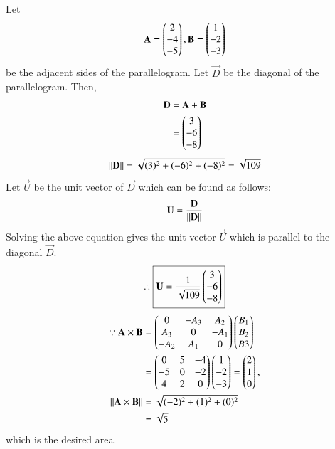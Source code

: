 
 Let 
    \begin{align}
        \mathbf{A}=\begin{pmatrix}2\\-4\\-5\end{pmatrix}, \mathbf{B}=\begin{pmatrix}1\\-2\\-3\end{pmatrix}
    \end{align}
    be the adjacent sides of the parallelogram. Let $\vec{D}$ be the diagonal of the parallelogram. Then,
    \begin{align}
        \mathbf{D}&=\mathbf{A}+\mathbf{B}\\
&=\begin{pmatrix}3\\-6\\-8\end{pmatrix}
    \end{align}
   \begin{align}
       \left\lVert\mathbf{D}\right\rVert=\sqrt{(3)^2+(-6)^2+(-8)^2}=\sqrt{109}
   \end{align}
   Let $\vec{U}$ be the unit vector of $\vec{D}$ which can be found as follows:
   \begin{align}
       \mathbf{U}=\frac{\mathbf{D}}{\left\lVert\mathbf{D}\right\rVert}
   \end{align}
   Solving the above equation gives the unit vector $\vec{U}$ which is parallel to the diagonal $\vec{D}$.\\
   \begin{align}\therefore
       \boxed
       {\mathbf{U}=\frac{1}{\sqrt{109}}\begin{pmatrix}3\\-6\\-8\end{pmatrix}}
   \end{align}
   \begin{align}
  \because     \mathbf{A}\times\mathbf{B} &=\begin{pmatrix}0&-A_3&A_2\\A_3&0&-A_1\\-A_2&A_1&0\end{pmatrix}\begin{pmatrix}B_1\\B_2\\B3\end{pmatrix}\\
       &=\begin{pmatrix}0&5&-4\\-5&0&-2\\4&2&0\end{pmatrix}\begin{pmatrix}1\\-2\\-3\end{pmatrix}=\begin{pmatrix}2\\1\\0\end{pmatrix},
       \\
       \left\lVert\mathbf{A}\times\mathbf{B}\right\rVert&=\sqrt{(-2)^2+(1)^2+(0)^2}\\
       &=\sqrt{5}
\end{align}
which is the desired area.  

